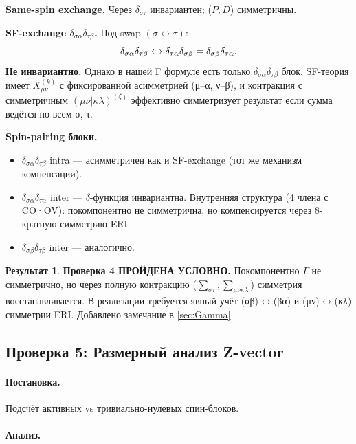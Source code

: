 \documentclass[11pt, a4paper]{article}
\theoremstyle{definition}
\newtheorem*{result}{Результат}
\begin{document}
\textbf{Same-spin exchange.} Через $\delta_{\sigma\tau}$ инвариантен; ($P, D$) симметричны. \checkmark

\textbf{SF-exchange $\delta_{\sigma\alpha}\delta_{\tau\beta}$.} Под swap $(\sigma \leftrightarrow \tau)$:
$$
\delta_{\sigma\alpha}\delta_{\tau\beta} \xleftrightarrow{} \delta_{\tau\alpha}\delta_{\sigma\beta} = \delta_{\sigma\beta}\delta_{\tau\alpha}.
$$
\textbf{Не инвариантно.} Однако в нашей Γ формуле есть только $\delta_{\sigma\alpha}\delta_{\tau\beta}$ блок. SF-теория имеет $X^{(k)}_{\mu\nu}$ с фиксированной асимметрией (μ--α, ν--β), и контракция с симметричным $(\mu\nu | \kappa\lambda)^{(\xi)}$ эффективно симметризует результат если сумма ведётся по всем σ, τ.

\textbf{Spin-pairing блоки.}
\begin{itemize}
    \item $\delta_{\sigma\alpha}\delta_{\tau\beta}$ intra --- асимметричен как и SF-exchange (тот же механизм компенсации).
    \item $\delta_{\sigma\alpha}\delta_{\tau\alpha}$ inter --- $\delta$-функция инвариантна. Внутренняя структура (4 члена с CO·OV): покомпонентно не симметрична, но компенсируется через 8-кратную симметрию ERI.
    \item $\delta_{\sigma\beta}\delta_{\tau\beta}$ inter --- аналогично.
\end{itemize}

\begin{result}
\textbf{Проверка 4 ПРОЙДЕНА УСЛОВНО.} Покомпонентно $\Gamma$ не симметрично, но через полную контракцию ($\sum_{\sigma\tau}, \sum_{\mu\nu\kappa\lambda}$) симметрия восстанавливается. В реализации требуется явный учёт (αβ)$\leftrightarrow$(βα) и (μν)$\leftrightarrow$(κλ) симметрии ERI. Добавлено замечание в \cref{sec:Gamma}.
\end{result}

\subsection{Проверка 5: Размерный анализ Z-vector}

\paragraph{Постановка.} Подсчёт активных vs тривиально-нулевых спин-блоков.

\paragraph{Анализ.}
\end{document}
